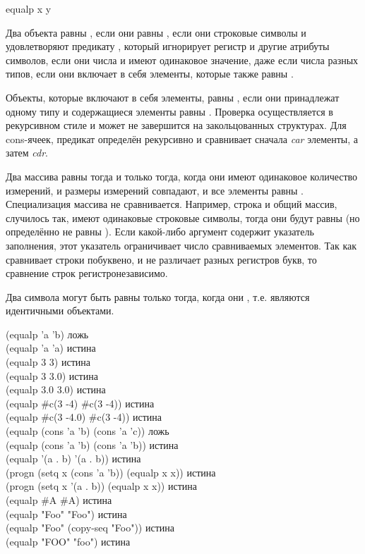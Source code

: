 \begin{defun}[Функция]
\begin{defun}[Функция]
equalp x y

Два объекта равны , если они равны ,
если они строковые символы и удовлетворяют предикату , который
игнорирует регистр и другие атрибуты символов,
если они числа и имеют одинаковое значение, даже если числа разных типов,
если они включает в себя элементы, которые также равны .

Объекты, которые включают в себя элементы, равны , если они
принадлежат одному типу и содержащиеся элементы равны .
Проверка осуществляется в рекурсивном стиле и может не завершится на
закольцованных структурах.
Для cons-ячеек, предикат  определён рекурсивно и сравнивает сначала
\emph{car} элементы, а затем \emph{cdr}.

Два массива равны  тогда и только тогда, когда они имеют одинаковое
количество измерений, и размеры измерений совпадают, и все элементы равны
. Специализация массива не сравнивается. Например,
строка и общий массив, случилось так, имеют одинаковые строковые символы,
тогда они будут равны  (но определённо не равны ).
Если какой-либо аргумент содержит указатель заполнения, этот указатель
ограничивает число сравниваемых элементов. Так как  сравнивает
строки побуквено, и не различает разных регистров букв, то сравнение строк
регистронезависимо.

Два символа могут быть равны  только тогда, когда они ,
т.е. являются идентичными объектами.

\begin{lisp}
(equalp 'a 'b) \textrm{ложь} \\
(equalp 'a 'a) \textrm{истина} \\
(equalp 3 3) \textrm{истина} \\
(equalp 3 3.0) \textrm{истина} \\
(equalp 3.0 3.0) \textrm{истина} \\
(equalp \#c(3 -4) \#c(3 -4)) \textrm{истина} \\
(equalp \#c(3 -4.0) \#c(3 -4)) \textrm{истина} \\
(equalp (cons 'a 'b) (cons 'a 'c)) \textrm{ложь} \\
(equalp (cons 'a 'b) (cons 'a 'b)) \textrm{истина} \\
(equalp '(a . b) '(a . b)) \textrm{истина} \\
(progn (setq x (cons 'a 'b)) (equalp x x)) \textrm{истина} \\
(progn (setq x '(a . b)) (equalp x x)) \textrm{истина} \\
(equalp \#{\Xbackslash}A \#{\Xbackslash}A) \textrm{истина} \\
(equalp "Foo" "Foo") \textrm{истина} \\
(equalp "Foo" (copy-seq "Foo")) \textrm{истина} \\
(equalp "FOO" "foo") \textrm{истина}
\end{lisp}
\end{defun}


\end{defun}
